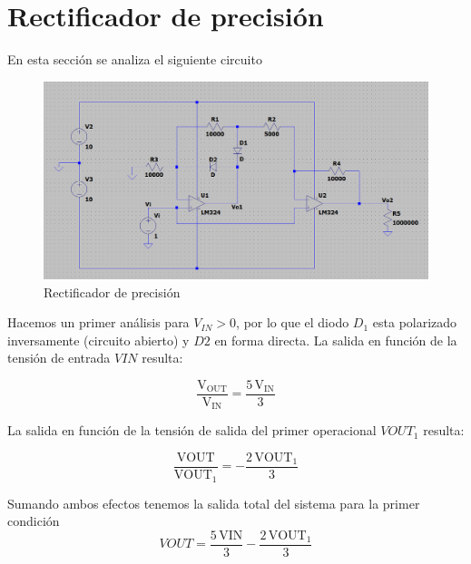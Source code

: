 \documentclass[12pt]{article}
\begin{document}
		
	\section{Rectificador de precisión}
	En esta sección se analiza el siguiente circuito
	\begin{figure}[h]
		\centering
		\includegraphics[width=1\linewidth]{Simulaciones-Resultados/Circuito3_esquematico}
		\caption{Rectificador de precisión}
		\label{fig:circuito3esquematico}
	\end{figure}
		
	Hacemos un primer análisis para $V_{IN}>0$, por lo que el diodo $D_1$
	esta polarizado inversamente (circuito abierto) y $D2$ en forma directa. La salida en 
	función de la tensión de entrada $VIN$ resulta:
	
	\begin{equation}
		\frac{\mathrm{V_{OUT}}}{\mathrm{V_{IN}}}=\frac{5\,\mathrm{V_{IN}}}{3}
	\end{equation}
	
	La salida en función de la tensión de salida del primer operacional $VOUT_1$ resulta:
	
	\begin{equation}
		\frac{\mathrm{VOUT}}{{\textrm{VOUT}}_1 }=-\frac{2\,{\textrm{VOUT}}_1 }{3}
	\end{equation}
	
	Sumando ambos efectos tenemos la salida total del sistema para la primer condición
	\begin{equation}
		{VOUT}=\frac{5\,\mathrm{VIN}}{3}-\frac{2\,{\textrm{VOUT}}_1 }{3}
	\end{equation}
	
		
		
\end{document}
